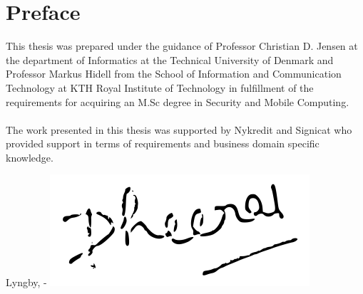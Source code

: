 \chapter{Preface}

This thesis was prepared under the guidance of Professor Christian D. Jensen at the department of Informatics at the Technical University of Denmark and Professor Markus Hidell from the School of Information and Communication Technology at KTH Royal Institute of Technology in fulfillment of the requirements for acquiring an M.Sc degree in Security and Mobile Computing.
\\\\The work presented in this thesis was supported by Nykredit and Signicat who provided support in terms of requirements and business domain specific knowledge.

\vspace{20mm}
\begin{center}
    \hspace{20mm} Lyngby, \thesishandin-\thesisyear
    \vspace{5mm}
    \newline
    \includegraphics[scale=0.5]{figures/Signature}
\end{center}
\begin{flushright}
    \thesisauthor
\end{flushright}
